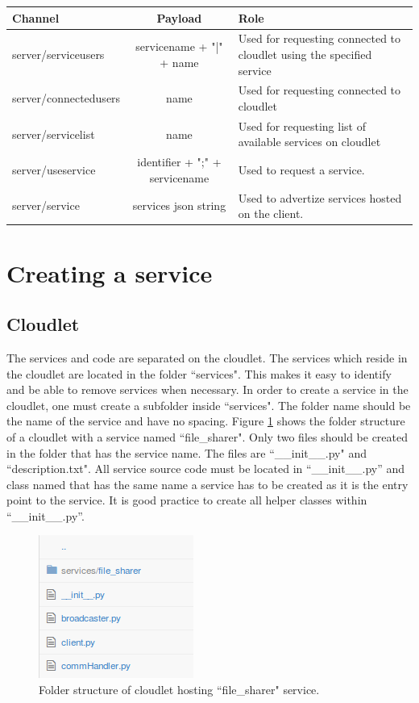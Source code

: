 \begin{center}
  \begin{tabular}{ l | c | l }
    \hline
    Channel & Payload & Role \\ \hline \hline
    server/serviceusers & servicename + "|" + name & Used for requesting connected to cloudlet using the specified service \\ \hline
    server/connectedusers & name & Used for requesting connected to cloudlet \\ \hline
    server/servicelist & name & Used for requesting list of available services on cloudlet \\ \hline
    server/useservice & identifier + ";" + servicename & Used to request a service. \\ \hline
    server/service  & services json string & Used to advertize services hosted on the client. \\
    \hline
  \end{tabular}
\end{center}

\section{Creating a service}

\subsection{Cloudlet}
The services and code are separated on the cloudlet. The services which reside in the cloudlet are located in the folder ``services". This makes it easy to identify and be able to remove services when necessary. In order to create a service in the cloudlet, one must create a subfolder inside ``services". The folder name should be the name of the service and have no spacing. Figure \ref{fig:folderstructure} shows the folder structure of a cloudlet with a service named ``file\_sharer". Only two files should be created in the folder that has the service name. The files are ``\_\_init\_\_.py" and ``description.txt". All service source code must be located in ``\_\_init\_\_.py” and class named that has the same name a service has to be created as it is the entry point to the service. It is good practice to create all helper classes within ``\_\_init\_\_.py”.

\begin{figure}[!h]
\centering
\includegraphics{figures/fstrucure}
\caption{Folder structure of cloudlet hosting ``file\_sharer" service.}
\label{fig:folderstructure}
\end{figure}

